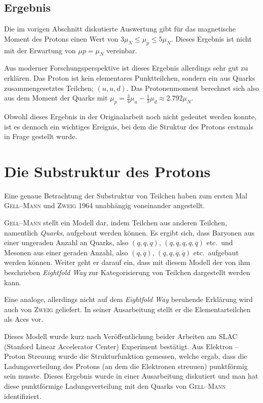 \documentclass[sn-mathphys-num,iicol]{sn-jnl}
\theoremstyle{thmstyleone}
\theoremstyle{thmstyletwo}
\theoremstyle{thmstylethree}
\begin{document}
\subsection{Ergebnis}
Die im vorigen Abschnitt diskutierte Auswertung gibt für das magnetische Moment des Protons einen Wert von $3\mu _N\leq \mu _p\leq 5\mu _N$.
Dieses Ergebnis ist nicht mit der Erwartung von $\mu p=\mu _N$ vereinbar.\cite{FrischStern1933}

Aus moderner Forschungsperspektive ist dieses Ergebnis allerdings sehr gut zu erklären.
Das Proton ist kein elementares Punktteilchen, sondern ein aus Quarks zusammengesetztes Teilchen; $\left(u,u,d\right)$.
Das Protonenmoment berechnet sich also aus dem Moment der Quarks mit $\mu _p=\tfrac{3}{4}\mu _u-\tfrac{1}{3}\mu _d\approx 2.792\mu _N$\cite{CODATA_proton_magneton}.

Obwohl dieses Ergebnis in der Originalarbeit noch nicht gedeutet werden konnte, ist es dennoch ein wichtiges Ereignis, bei dem die Struktur des Protons erstmals in Frage gestellt wurde.

\section{Die Substruktur des Protons}
Eine genaue Betrachtung der Substruktur von Teilchen haben zum ersten Mal \textsc{Gell--Mann}\cite{Gellmann1964} und \textsc{Zweig}\cite{Zweig1964} 1964 unabhängig voneinander angestellt.

\textsc{Gell--Mann}\cite{Gellmann1964} stellt ein Modell dar, indem Teilchen aus anderen Teilchen, namentlich \textit{Quarks}, aufgebaut werden können.
Es ergibt sich, dass Baryonen aus einer ungeraden Anzahl an Quarks, also $\left(q,q,q\right)$, $\left(q,q,q,q,\overline{q}\right)$ etc.\ und Mesonen aus einer geraden Anzahl, also $\left(q,\overline{q}\right)$, $\left(q,q,\overline{q},\overline{q}\right)$ etc.\ aufgebaut werden können.
Weiter geht er darauf ein, dass mit diesem Modell der von ihm beschrieben \textit{Eightfold Way} zur Kategorisierung von Teilchen dargestellt werden kann.

Eine analoge, allerdings nicht auf dem \textit{Eightfold Way} beruhende Erklärung wird auch von \textsc{Zweig}\cite{Zweig1964} geliefert.
In seiner Ausarbeitung stellt er die Elementarteilchen als Aces vor.

Dieses Modell wurde kurz nach Veröffentlichung beider Arbeiten am SLAC (Stanford Linear Accelerator Center) Experiment bestätigt.\cite{Bloom1969}
Aus Elektron -- Proton Streuung wurde die Strukturfunktion gemessen, welche ergab, dass die Ladungsverteilung des Protons (an dem die Elektronen streuuen) punktförmig sein musste.
Dieses Ergebnis wurde in einer Ausarbeitung diskutiert und man hat diese punktförmige Ladungsverteilung mit den Quarks von \textsc{Gell--Mann} identifiziert.
\end{document}
